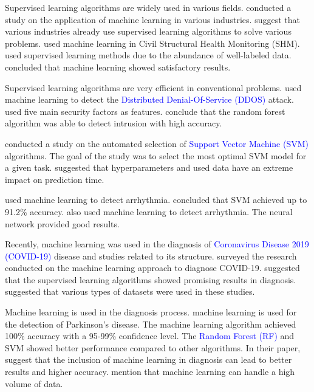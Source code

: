 \documentclass[a4paper,fleqn]{cas-dc}
\newcommand{\responsemodsm}[1]{\textcolor{blue}{#1}}
\begin{document}
Supervised learning algorithms are widely used in various fields. \cite*{ref_paper_14} conducted a study on the application of machine learning in various industries. \citeauthor{ref_paper_14} suggest that various industries already use supervised learning algorithms to solve various problems. \cite*{ref_paper_6} used machine learning in Civil Structural Health Monitoring (SHM). \citeauthor{ref_paper_6} used supervised learning methods due to the abundance of well-labeled data. \citeauthor{ref_paper_6} concluded that machine learning showed satisfactory results.

Supervised learning algorithms are very efficient in conventional problems. \cite*{ref_paper_9} used machine learning to detect the \responsemodsm{Distributed Denial-Of-Service (DDOS)} attack. \citeauthor{ref_paper_9} used five main security factors as features. \citeauthor{ref_paper_9} conclude that the random forest algorithm was able to detect intrusion with high accuracy.

\cite*{ref_paper_2} conducted a study on the automated selection of \responsemodsm{Support Vector Machine (SVM)} algorithms. The goal of the study was to select the most optimal SVM model for a given task. \citeauthor{ref_paper_2} suggested that hyperparameters and used data have an extreme impact on prediction time.

\cite*{ref_paper_38} used machine learning to detect arrhythmia. \citeauthor{ref_paper_38} concluded that SVM achieved up to 91.2\% accuracy. \cite*{ref_paper_16} also used machine learning to detect arrhythmia. The neural network provided good results.

Recently, machine learning was used in the diagnosis of \responsemodsm{Coronavirus Disease 2019 (COVID-19)} disease and studies related to its structure. \cite*{ref_paper_20} surveyed the research conducted on the machine learning approach to diagnose COVID-19. \citeauthor{ref_paper_20} suggested that the supervised learning algorithms showed promising results in diagnosis. \citeauthor{ref_paper_20} suggested that various types of datasets were used in these studies.

Machine learning is used in the diagnosis process. \cite*{ref_paper_34} machine learning is used for the detection of Parkinson's disease. The machine learning algorithm achieved 100\% accuracy with a 95-99\% confidence level. The \responsemodsm{Random Forest (RF)} and SVM showed better performance compared to other algorithms. In their paper, \cite*{ref_paper_15} suggest that the inclusion of machine learning in diagnosis can lead to better results and higher accuracy. \citeauthor{ref_paper_15} mention that machine learning can handle a high volume of data.
\end{document}
